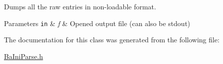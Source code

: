 Dumps all the raw entries in non-\/loadable format. 


\begin{DoxyParams}[1]{Parameters}
\mbox{\tt in}  & {\em f} & Opened output file (can also be stdout) \\
\hline
\end{DoxyParams}


The documentation for this class was generated from the following file\+:\begin{DoxyCompactItemize}
\item 
\hyperlink{BaIniParse_8h}{Ba\+Ini\+Parse.\+h}\end{DoxyCompactItemize}
